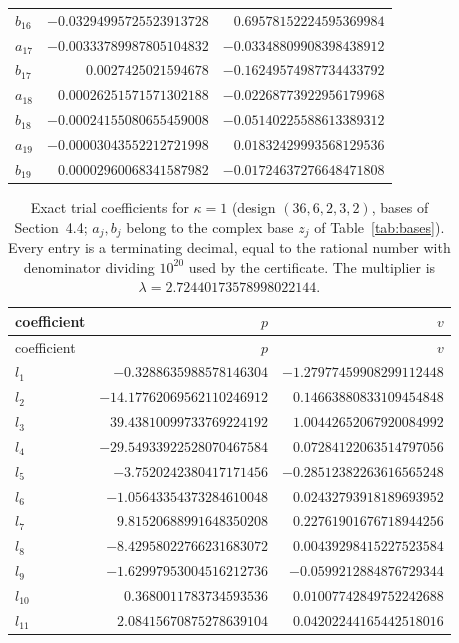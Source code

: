 \documentclass[11pt]{article}
\theoremstyle{definition}
\begin{document}
{\begin{longtable}{lrr}
$b_{16}$ & $-0.03294995725523913728$ & $0.69578152224595369984$\\
$a_{17}$ & $-0.00333789987805104832$ & $-0.03348809908398438912$\\
$b_{17}$ & $0.0027425021594678$ & $-0.16249574987734433792$\\
$a_{18}$ & $0.00026251571571302188$ & $-0.02268773922956179968$\\
$b_{18}$ & $-0.00024155080655459008$ & $-0.05140225588613389312$\\
$a_{19}$ & $-0.00003043552212721998$ & $0.01832429993568129536$\\
$b_{19}$ & $0.00002960068341587982$ & $-0.01724637276648471808$\\
\bottomrule
\end{longtable}}

{\small
\begin{longtable}{lrr}
\caption{Exact trial coefficients for $\kappa=1$ (design $(36,6,2,3,2)$, bases of Section~4.4; $a_j,b_j$ belong to the complex base $z_j$ of Table~\ref{tab:bases}). Every entry is a terminating decimal, equal to the rational number with denominator dividing $10^{20}$ used by the certificate. The multiplier is $\lambda=2.72440173578998022144$.}\label{tab:coef1b}\\
\toprule coefficient & $p$ & $v$\\\midrule\endfirsthead
\toprule coefficient & $p$ & $v$\\\midrule\endhead
$l_{1}$ & $-0.3288635988578146304$ & $-1.27977459908299112448$\\
$l_{2}$ & $-14.17762069562110246912$ & $0.14663880833109454848$\\
$l_{3}$ & $39.43810099733769224192$ & $1.00442652067920084992$\\
$l_{4}$ & $-29.54933922528070467584$ & $0.07284122063514797056$\\
$l_{5}$ & $-3.7520242380417171456$ & $-0.28512382263616565248$\\
$l_{6}$ & $-1.05643354373284610048$ & $0.02432793918189693952$\\
$l_{7}$ & $9.81520688991648350208$ & $0.22761901676718944256$\\
$l_{8}$ & $-8.42958022766231683072$ & $0.00439298415227523584$\\
$l_{9}$ & $-1.62997953004516212736$ & $-0.0599212884876729344$\\
$l_{10}$ & $0.3680011783734593536$ & $0.01007742849752242688$\\
$l_{11}$ & $2.08415670875278639104$ & $0.04202244165442518016$\\

\end{longtable}}
\end{document}
